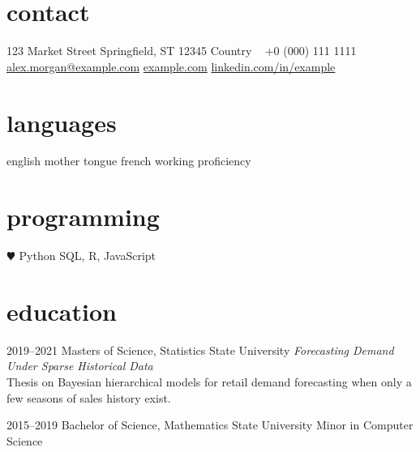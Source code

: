 \documentclass[]{friggeri-cv-a4}
\begin{document}


\begin{aside} %
\section{contact}
123 Market Street
Springfield, ST 12345
Country
~
+0 (000) 111 1111
~
\href{mailto:alex.morgan@example.com}{alex.morgan@example.com}
\href{http://example.com}{example.com}
\href{http://linkedin.com/in/example}{linkedin.com/in/example}
\section{languages}
english mother tongue
french working proficiency
\section{programming}
{\color{red} $\varheartsuit$} Python
SQL, R, JavaScript
\end{aside}


\section{education}

\begin{entrylist}


\entry
{2019--2021}
{Masters {\normalfont of Science, Statistics}}
{State University}
{\emph{Forecasting Demand Under Sparse Historical Data} \\ Thesis on Bayesian hierarchical models for retail demand forecasting when only a few seasons of sales history exist.}


\entry
{2015--2019}
{Bachelor {\normalfont of Science, Mathematics}}
{State University}
{Minor in Computer Science}


\end{entrylist}
\end{document}
